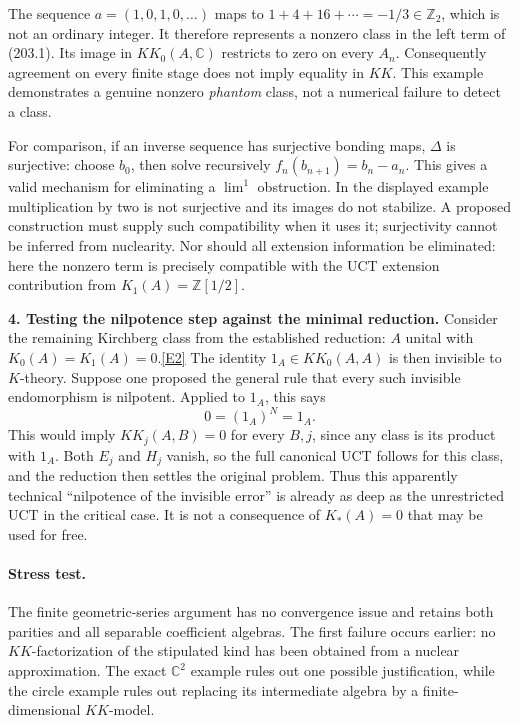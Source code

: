 \documentclass[11pt,a4paper]{article}
\newcommand{\Z}{\mathbb{Z}}
\newcommand{\C}{\mathbb{C}}
\newcommand{\eref}[2]{\hyperlink{extra:#1:#2}{[E#2]}}
\begin{document}
The sequence $a=(1,0,1,0,\ldots)$ maps to
$1+4+16+\cdots=-1/3\in\Z_2$, which is not an ordinary integer. It
therefore represents a nonzero class in the left term of (203.1).
Its image in $KK_0(A,\C)$ restricts to zero on every $A_n$.
Consequently agreement on every finite stage does not imply equality in
$KK$. This example demonstrates a genuine nonzero \emph{phantom} class,
not a numerical failure to detect a class.

For comparison, if an inverse sequence has surjective bonding maps,
$\Delta$ is surjective: choose $b_0$, then solve recursively
$f_n(b_{n+1})=b_n-a_n$. This gives a valid mechanism for eliminating a
$\lim^1$ obstruction. In the displayed example multiplication by two is
not surjective and its images do not stabilize. A proposed construction
must supply such compatibility when it uses it; surjectivity cannot be
inferred from nuclearity. Nor should all extension information be
eliminated: here the nonzero term is precisely compatible with the UCT
extension contribution from $K_1(A)=\Z[1/2]$.

\textbf{4. Testing the nilpotence step against the minimal reduction.}
Consider the remaining Kirchberg class from the established reduction:
$A$ unital with $K_0(A)=K_1(A)=0$.\eref{30006980}{2}
The identity $1_A\in KK_0(A,A)$ is then invisible to $K$-theory. Suppose
one proposed the general rule that every such invisible endomorphism is
nilpotent. Applied to $1_A$, this says
\[
 0=(1_A)^N=1_A.
\]
This would imply $KK_j(A,B)=0$ for every $B,j$, since any class is its
product with $1_A$. Both $E_j$ and $H_j$ vanish, so the full canonical
UCT follows for this class, and the reduction then settles the original
problem. Thus this apparently technical ``nilpotence of the invisible
error'' is already as deep as the unrestricted UCT in the critical case.
It is not a consequence of $K_*(A)=0$ that may be used for free.

\paragraph{Stress test.}
The finite geometric-series argument has no convergence issue and retains
both parities and all separable coefficient algebras. The first failure
occurs earlier: no $KK$-factorization of the stipulated kind has been
obtained from a nuclear approximation. The exact $\C^2$ example rules out
one possible justification, while the circle example rules out replacing
its intermediate algebra by a finite-dimensional $KK$-model.
\end{document}
